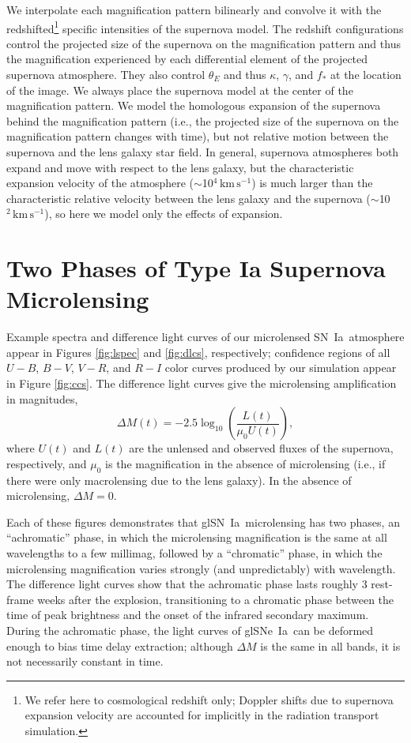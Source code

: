 \documentclass[iop,apj,numberedappendix,twocolappendix]{emulateapj}
\newcommand{\snia}{{\rm SN~Ia}}
\newcommand{\sneia}{{\rm SNe~Ia}}
\begin{document}
We interpolate each magnification pattern bilinearly and convolve it with the redshifted\footnote{We refer here to cosmological redshift only; Doppler shifts due to supernova expansion velocity are accounted for implicitly in the radiation transport simulation.} specific intensities of the supernova model.
The redshift configurations control the projected size of the supernova on the magnification pattern and thus the magnification experienced by each differential element of the projected supernova atmosphere.
They also control $\theta_E$ and thus $\kappa$, $\gamma$, and $f_*$ at the location of the image.
We always place the supernova model at the center of the magnification pattern. 
We model the homologous expansion of the supernova behind the magnification pattern (i.e., the projected size of the supernova on the magnification pattern changes with time), but not relative motion between the supernova and the lens galaxy star field. 
In general, supernova atmospheres both expand and move with respect to the lens galaxy, but the characteristic expansion velocity of the atmosphere ($\sim$10$^4\, \mathrm{km}\,\mathrm{s}^{-1}$) is much larger than the characteristic relative velocity between the lens galaxy and the supernova ($\sim$10$^2\,\mathrm{km}\,\mathrm{s}^{-1}$), so here we model only the effects of expansion.

\section{Two Phases of Type Ia Supernova Microlensing}
\label{sec:chrom}
Example spectra and difference light curves of our microlensed \snia\ atmosphere appear in Figures \ref{fig:lspec} and \ref{fig:dlcs}, respectively; confidence regions of all $U-B$, $B-V$, $V-R$, and $R-I$ color curves produced by our simulation appear in Figure \ref{fig:ccs}.
The difference light curves give the microlensing amplification in magnitudes,
\begin{equation}
\Delta M(t) = -2.5 \log_{10} \left(\frac{L(t)}{\mu_0 U(t)}\right),
\end{equation}
where $U(t)$ and $L(t)$ are the unlensed  and observed fluxes of the supernova, respectively, and $\mu_0$ is the magnification in the absence of microlensing (i.e., if there were only macrolensing due to the lens galaxy). 
In the absence of microlensing, $\Delta M = 0$.

Each of these figures demonstrates that gl\snia\ microlensing has two phases, an ``achromatic'' phase, in which the microlensing magnification is the same at all wavelengths to a few millimag, followed by a  ``chromatic'' phase, in which the microlensing magnification varies strongly (and unpredictably) with wavelength.
The difference light curves show that the achromatic phase lasts roughly 3 rest-frame weeks after the explosion, transitioning to a chromatic phase between the time of peak brightness and the onset of the infrared secondary maximum.
During the achromatic phase, the light curves of gl\sneia\ can be deformed enough to bias time delay extraction; although $\Delta M$ is the same in all bands, it is not necessarily constant in time.
\end{document}
